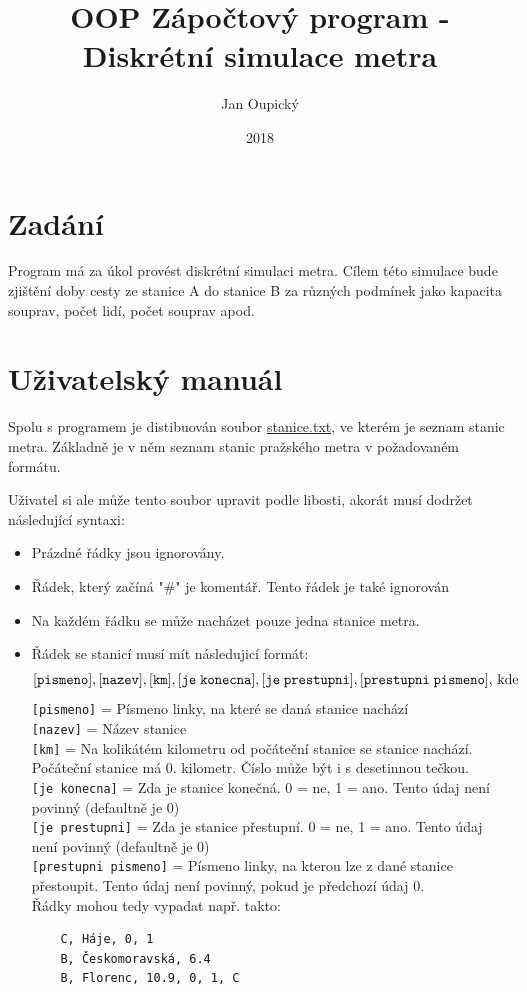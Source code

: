 \documentclass[12pt, a4paper]{article}
\title{OOP Zápočtový program - Diskrétní simulace metra}
\author{Jan Oupický}
\date{2018}
\begin{document}
\maketitle

\section{Zadání}

Program má za úkol provést diskrétní simulaci metra. Cílem této simulace bude zjištění doby cesty ze stanice A do stanice B za různých podmínek jako kapacita souprav, počet lidí, počet souprav apod. 

\section{Uživatelský manuál}

Spolu s programem je distibuován soubor \url{stanice.txt}, ve kterém je seznam stanic metra. Základně je v něm seznam stanic pražského metra v požadovaném formátu.

Uživatel si ale může tento soubor upravit podle libosti, akorát musí dodržet následující syntaxi:

\begin{itemize}
    \item Prázdné řádky jsou ignorovány.
    \item Řádek, který začíná "\#" je komentář. Tento řádek je také ignorován
    \item Na každém řádku se může nacházet pouze jedna stanice metra.
    \item Řádek se stanicí musí mít následujicí formát:
    \[ %
    \displayindent0pt
    \displaywidth\textwidth
    \mathtt{[pismeno], [nazev], [km], [je\;konecna], [je\;prestupni], [prestupni\;pismeno]}\text{, kde}
    \]
    \texttt{[pismeno]} = Písmeno linky, na které se daná stanice nachází\\
    \texttt{[nazev]} = Název stanice\\
    \texttt{[km]} = Na kolikátém kilometru od počáteční stanice se stanice nachází. Počáteční stanice má 0. kilometr. Číslo může být i s desetinnou tečkou.\\
    \texttt{[je konecna]} = Zda je stanice konečná. 0 = ne, 1 = ano. Tento údaj není povinný (defaultně je 0)\\
    \texttt{[je prestupni]} = Zda je stanice přestupní. 0 = ne, 1 = ano. Tento údaj není povinný (defaultně je 0)\\
    \texttt{[prestupni pismeno]} = Písmeno linky, na kterou lze z dané stanice přestoupit. Tento údaj není povinný, pokud je předchozí údaj 0.\\
    Řádky mohou tedy vypadat např. takto:
    \begin{verbatim}
    C, Háje, 0, 1
    B, Českomoravská, 6.4
    B, Florenc, 10.9, 0, 1, C
    \end{verbatim}
\end{itemize}
\end{document}
